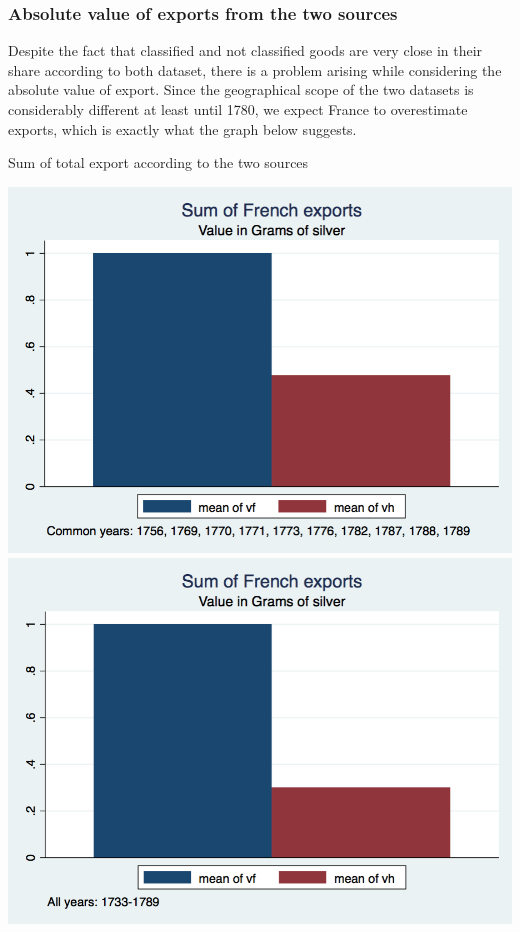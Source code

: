 \documentclass[12pt,a4paper,titlepage]{article}
\begin{document}
\subsubsection{Absolute value of exports from the two sources}
Despite the fact that classified and not classified goods are very close in their share according to both dataset, there is a problem arising while considering the absolute value of export. Since the geographical scope of the two datasets is considerably different at least until 1780, we expect France to overestimate exports, which is exactly what the graph below suggests.
\caption{Sum of total export according to the two sources}
\includegraphics[scale=.28]{value_total_fr_hb_commonyears.png}
\includegraphics[scale=.28]{value_total_fr_hb.png}
\end{document}
